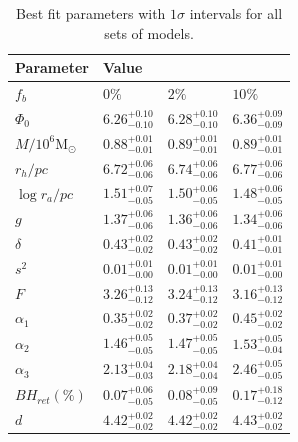 \begin{table}
	\centering
	\caption{Best fit parameters with $1\sigma$ intervals for all sets of models.}
	\begin{tabular}{l l l l}

		\hline
		Parameter                 & Value                                                                    \\
		\hline
		$f_b$                     & $0\%$                  & $2\%$                  & $10\%$                 \\
		$\Phi_0$                  & $6.26^{+0.10}_{-0.10}$ & $6.28^{+0.10}_{-0.10}$ & $6.36^{+0.09}_{-0.09}$ \\
		$M/10^6 \mathrm{M}_\odot$ & $0.88^{+0.01}_{-0.01}$ & $0.89^{+0.01}_{-0.01}$ & $0.89^{+0.01}_{-0.01}$ \\
		$r_h / pc$                & $6.72^{+0.06}_{-0.06}$ & $6.74^{+0.06}_{-0.06}$ & $6.77^{+0.06}_{-0.06}$ \\
		$\log{r_a / pc}$          & $1.51^{+0.07}_{-0.05}$ & $1.50^{+0.06}_{-0.05}$ & $1.48^{+0.06}_{-0.05}$ \\
		$g$                       & $1.37^{+0.06}_{-0.06}$ & $1.36^{+0.06}_{-0.06}$ & $1.34^{+0.06}_{-0.06}$ \\
		$\delta$                  & $0.43^{+0.02}_{-0.02}$ & $0.43^{+0.02}_{-0.02}$ & $0.41^{+0.01}_{-0.01}$ \\
		$s^2$                     & $0.01^{+0.01}_{-0.00}$ & $0.01^{+0.01}_{-0.00}$ & $0.01^{+0.01}_{-0.00}$ \\
		$F$                       & $3.26^{+0.13}_{-0.12}$ & $3.24^{+0.13}_{-0.12}$ & $3.16^{+0.13}_{-0.12}$ \\
		$\alpha_1$                & $0.35^{+0.02}_{-0.02}$ & $0.37^{+0.02}_{-0.02}$ & $0.45^{+0.02}_{-0.02}$ \\
		$\alpha_2$                & $1.46^{+0.05}_{-0.05}$ & $1.47^{+0.05}_{-0.05}$ & $1.53^{+0.05}_{-0.04}$ \\
		$\alpha_3$                & $2.13^{+0.04}_{-0.03}$ & $2.18^{+0.04}_{-0.04}$ & $2.46^{+0.05}_{-0.05}$ \\
		$BH_{ret} (\%)$           & $0.07^{+0.06}_{-0.05}$ & $0.08^{+0.09}_{-0.05}$ & $0.17^{+0.18}_{-0.12}$ \\
		$d$                       & $4.42^{+0.02}_{-0.02}$ & $4.42^{+0.02}_{-0.02}$ & $4.43^{+0.02}_{-0.02}$ \\
		\hline
	\end{tabular}
	\label{tab:parameters_all}
\end{table}







